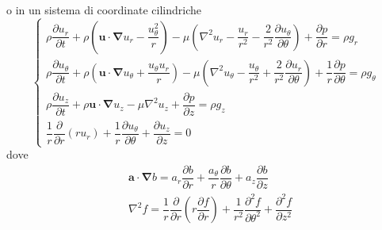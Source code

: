 o in un sistema di coordinate cilindriche
\begin{equation}
  \begin{cases}
    \rho \dfrac{\partial u_r}{\partial t}
    + \rho \left( \bm{u} \cdot \bm{\nabla}u_r - \dfrac{u_\theta^2}{r} \right)
    - \mu \left(\nabla^2 u_r 
       - \dfrac{u_r}{r^2} 
       - \dfrac{2}{r^2}\dfrac{\partial u_\theta}{\partial \theta} \right)  
       + \dfrac{\partial p}{\partial r} = \rho g_r \\
    \rho \dfrac{\partial u_\theta}{\partial t}
    + \rho \left( \bm{u} \cdot \bm{\nabla} u_\theta + \dfrac{u_\theta u_r}{r} \right)
    - \mu \left(\nabla^2 u_\theta 
       - \dfrac{u_\theta}{r^2} 
       + \dfrac{2}{r^2}\dfrac{\partial u_r}{\partial \theta}  \right) 
    + \dfrac{1}{r} \dfrac{\partial p}{\partial \theta} = \rho g_\theta\\
    \rho \dfrac{\partial u_z}{\partial t}
    + \rho \bm{u} \cdot \bm{\nabla} u_z
    - \mu \nabla^2 u_z
    + \dfrac{\partial p}{\partial z} = \rho g_z \\
    \dfrac{1}{r}\dfrac{\partial}{\partial r}\left( r u_r \right) 
    + \dfrac{1}{r}\dfrac{\partial u_\theta}{\partial \theta} 
    + \dfrac{\partial u_z}{\partial z} = 0
  \end{cases}
  \end{equation}
 dove
  \begin{equation}
  \begin{aligned}
  & \bm{a} \cdot \bm{\nabla} b = a_r \dfrac{\partial b}{\partial r} 
     + \dfrac{a_\theta}{r} \dfrac{\partial b}{\partial \theta}  
     + a_z \dfrac{\partial b}{\partial z} \\
  & \nabla^2 f = \dfrac{1}{r}\dfrac{\partial}{\partial r}
                      \left(r \dfrac{\partial f}{\partial r} \right) +
               \dfrac{1}{r^2} \dfrac{\partial^2 f}{\partial \theta^2} + 
               \dfrac{\partial^2 f}{\partial z^2} 
  \end{aligned}
\end{equation}

